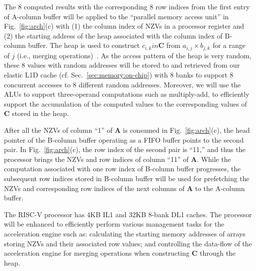 

The 8 computed results with the corresponding 8 row indices from the first entry of A-column buffer will be applied to 
the ``parallel memory access unit'' in Fig.~\ref{fig:arch}(c) with 
(1) the column index of NZVs in a processor register and (2) the starting address of the heap associated with the column index of B-column buffer.
The heap is used to construct $c_{i,k} in $\textbf{C} from $a_{i,j} \times b_{j,k}$ for a range of $j$ (i.e., merging operations)~\cite{buluc:ipdps:2015}. 
As the access pattern of the heap is very random, these 8 values with random addresses will be stored to and retrieved from our elastic L1D cache (cf. Sec.~\ref{sec:memory:on-chip}) with 8 banks to support 8 concurrent accesses to 8 different random addresses.
Moreover, we will use the ALUs to support three-operand computations such as multiply-add, to efficiently support the accumulation of 
the computed values to the corresponding values of \textbf{C} stored in the heap.


After all the NZVs of column ``1'' of \textbf{A} is consumed in Fig.~\ref{fig:arch}(c), 
the head pointer of the B-column buffer operating as a FIFO buffer points to the second pair.
In Fig.~\ref{fig:arch}(c), the row index of the second pair is ``11,'' 
and thus the processor brings the NZVs and row indices of column ``11'' of \textbf{A}. 
While the computation associated with one row index of B-column buffer progresses, 
the subsequent row indices stored in B-column buffer will be used for prefetching the NZVs and corresponding row indices of the next columns of \textbf{A} to the A-column buffer.


The RISC-V processor has 4KB IL1 and 32KB 8-bank DL1 caches.
The processor will be enhanced to efficiently perform various management tasks for the acceleration engine such as:
calculating the starting memory addresses of arrays storing NZVs 
and their associated row values; and
controlling the data-flow of the acceleration engine for merging operations when constructing \textbf{C} through the heap.
 

